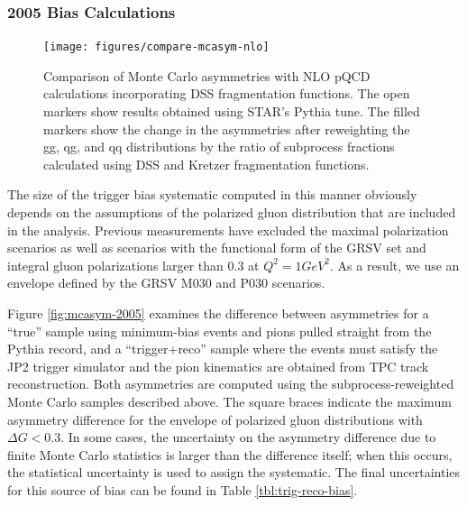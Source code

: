 \subsubsection{2005 Bias Calculations}

\begin{figure}
  \texttt{[image: figures/compare-mcasym-nlo]}
  \caption{Comparison of Monte Carlo asymmetries with NLO pQCD calculations
  incorporating DSS fragmentation functions. The open markers show results
  obtained using STAR's Pythia tune. The filled markers show the change in the
  asymmetries after reweighting the gg, qg, and qq distributions by the ratio
  of subprocess fractions calculated using DSS and Kretzer fragmentation
  functions.}
  \label{fig:compare-mcasym-nlo}
\end{figure}

The size of the trigger bias systematic computed in this manner obviously
depends on the assumptions of the polarized gluon distribution that are included
in the analysis. Previous measurements have excluded the maximal polarization
scenarios as well as scenarios with the functional form of the GRSV set and
integral gluon polarizations larger than 0.3 at \(Q^2 = 1 GeV^2\). As a result,
we use an envelope defined by the GRSV M030 and P030 scenarios.

Figure \ref{fig:mcasym-2005} examines the difference between asymmetries for a
``true'' sample using minimum-bias events and pions pulled straight from the
Pythia record, and a ``trigger+reco'' sample where the events must satisfy the
JP2 trigger simulator and the pion kinematics are obtained from TPC track
reconstruction. Both asymmetries are computed using the subprocess-reweighted
Monte Carlo samples described above.  The square braces indicate the maximum asymmetry difference for the envelope of polarized gluon distributions with \(\Delta G < 0.3\).  In some cases, the uncertainty on the asymmetry difference due to finite Monte Carlo statistics is larger than the difference itself;  when this occurs, the statistical uncertainty is used to assign the systematic.  The final uncertainties for this source of bias can be found in Table \ref{tbl:trig-reco-bias}.

